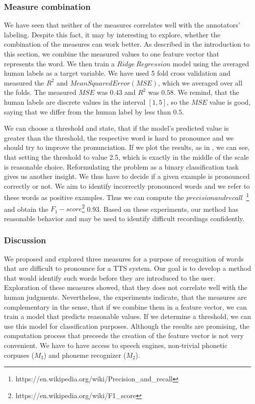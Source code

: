 \subsubsection{Measure combination}
We have seen that neither of the measures correlates well with the annotators' labeling.
Despite this fact, it may by interesting to explore, whether the combination of the measures can work better.
As described in the introduction to this section, we combine the measured values to one feature vector that represents the word.
We then train a $Ridge\: Regression$ model using the averaged human labels as a target variable.
We have used 5 fold cross validation and measured the $R^2$ and $Mean Squared Error (MSE)$, which we averaged over all the folds.
The measured $MSE$ was $0.43$ and $R^2$ was $0.58$.
We remind, that the human labels are discrete values in the interval $[1,5]$, so the $MSE$ value is good, saying that we differ from the human label by less than $0.5$.
\par
We can choose a threshold and state, that if the model's predicted value is greater than the threshold, the respective word is hard to pronounce and we should try to improve the pronunciation.
If we plot the results, as in , we can see, that setting the threshold to value 2.5, which is exactly  in the middle of the scale is reasonable choice.
Reformulating the problem as a binary classification task gives us another insight.
We thus have to decide if a given example is pronounced correctly or not.
We aim to identify incorrectly pronounced words and we refer to these words as positive examples.
Thus we can compute the $precision and recall$~\footnote{https://en.wikipedia.org/wiki/Precision\_and\_recall} and obtain the $F_1 - score$\footnote{https://en.wikipedia.org/wiki/F1\_score} 0.93.
Based on these experiments, our method has reasonable behavior and may be used to identify difficult recordings confidently.
\subsubsection{Discussion}
We proposed and explored three measures for a purpose of recognition of words that are difficult to pronounce for a TTS system.
Our goal is to develop a method that would identify such words before they are introduced to the user.
Exploration of these measures showed, that they does not correlate well with the human judgments.
Nevertheless, the experiments indicate, that the measures are complementary in the sense, that if we combine them in a feature vector, we can train a model that predicts reasonable values.
If we determine a threshold, we can use this model for classification purposes.
Although the results are promising, the computation process that preceeds the creation of the feature vector is not very convenient.
We have to have access to speech engines, non-trivial phonetic corpuses ($M_3$) and phoneme recognizer ($M_2$).